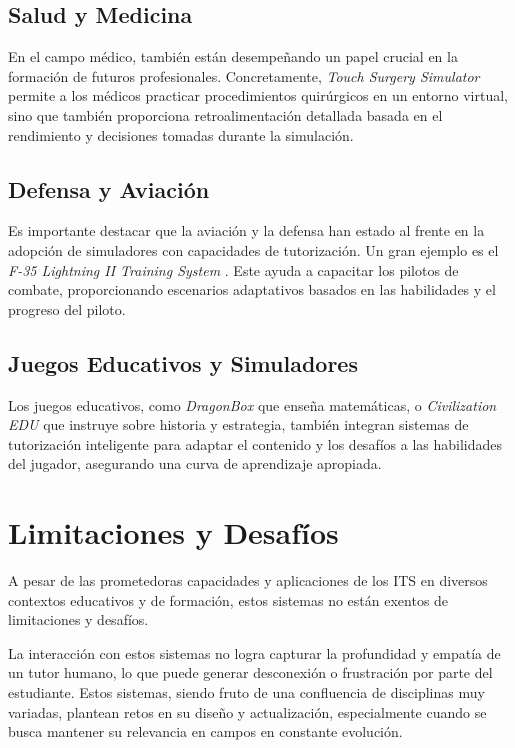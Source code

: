 \subsection{Salud y Medicina}

En el campo médico, también están desempeñando un papel crucial en la formación de futuros profesionales. Concretamente, \textit{Touch Surgery Simulator} \cite{touchsurgery} permite a los médicos practicar procedimientos quirúrgicos en un entorno virtual, sino que también proporciona retroalimentación detallada basada en el rendimiento y decisiones tomadas durante la simulación.

\subsection{Defensa y Aviación}

Es importante destacar que la aviación y la defensa han estado al frente en la adopción de simuladores con capacidades de tutorización. Un gran ejemplo es el \textit{F-35 Lightning II Training System} \cite{f35training}. Este ayuda a capacitar los pilotos de combate, proporcionando escenarios adaptativos basados en las habilidades y el progreso del piloto.

\subsection{Juegos Educativos y Simuladores}

Los juegos educativos, como \textit {DragonBox} \cite{dragonbox} que enseña matemáticas, o \textit {Civilization EDU} \cite{civilizationedu} que instruye sobre historia y estrategia, también integran sistemas de tutorización inteligente para adaptar el contenido y los desafíos a las habilidades del jugador, asegurando una curva de aprendizaje apropiada.


\section{Limitaciones y Desafíos}

A pesar de las prometedoras capacidades y aplicaciones de los ITS en diversos contextos educativos y de formación, estos sistemas no están exentos de limitaciones y desafíos. 

La interacción con estos sistemas no logra capturar la profundidad y empatía de un tutor humano, lo que puede generar desconexión o frustración por parte del estudiante. Estos sistemas, siendo fruto de una confluencia de disciplinas muy variadas, plantean retos en su diseño y actualización, especialmente cuando se busca mantener su relevancia en campos en constante evolución.

